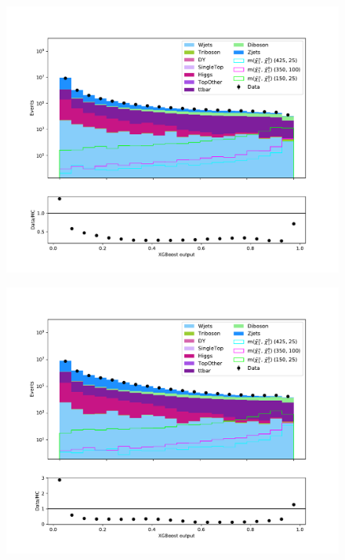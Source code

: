 \begin{figure}[H]
    \centering
        \includegraphics[width = \textwidth]{Figures/Stacked/stackedplot_BDT_All_level_WW.pdf}
        \caption{}
        \label{fig:traintestscaled}
\end{figure}

\begin{figure}[H]
    \centering
        \includegraphics[width = \textwidth]{Figures/Stacked/stackedplot_BDT_Low_level_WW.pdf}
        \caption{}
        \label{fig:traintestscaled}
\end{figure}

